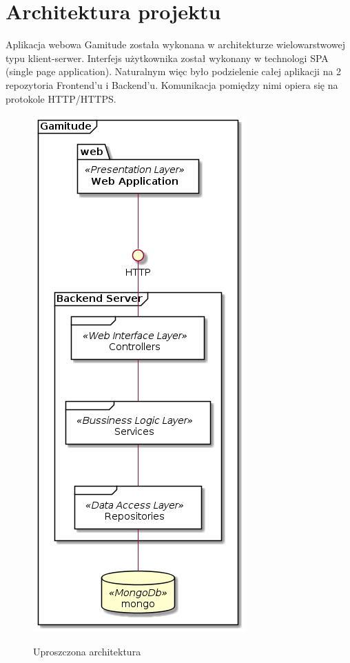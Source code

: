 \documentclass[a4paper,11pt]{report}
\begin{document}
\section {Architektura projektu}
Aplikacja webowa Gamitude została wykonana w architekturze wielowarstwowej typu klient-serwer.
Interfejs użytkownika został wykonany w technologi SPA (single page application).
Naturalnym więc było podzielenie całej aplikacji na 2 repozytoria Frontend'u i Backend'u.
Komunikacja pomiędzy nimi opiera się na protokole HTTP/HTTPS.\\
\begin{figure}[H]
	\centering
	\includegraphics[scale=0.5]{gamitude_overview}\\
	\caption{Uproszczona architektura}
	\label{fig:overwiewarch}
\end{figure}
\end{document}
